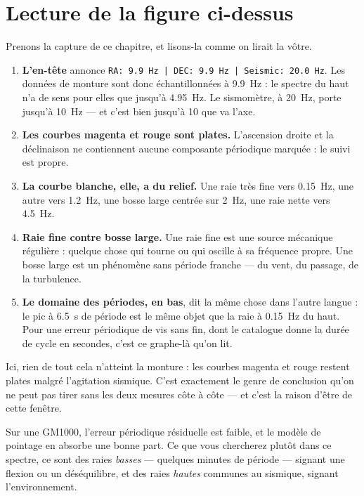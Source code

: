 \documentclass[a4paper,11pt,twoside]{report}
\begin{document}
\section{Lecture de la figure ci-dessus}

Prenons la capture de ce chapitre, et lisons-la comme on lirait la vôtre.

\begin{enumerate}
\item \textbf{L'en-tête} annonce \texttt{RA: 9.9 Hz | DEC: 9.9 Hz |
Seismic: 20.0 Hz}. Les données de monture sont donc échantillonnées à
\SI{9,9}{\hertz} : le spectre du haut n'a de sens pour elles que jusqu'à
\SI{4,95}{\hertz}. Le sismomètre, à \SI{20}{\hertz}, porte jusqu'à
\SI{10}{\hertz} --- et c'est bien jusqu'à \num{10} que va l'axe.

\item \textbf{Les courbes magenta et rouge sont plates.} L'ascension droite
et la déclinaison ne contiennent aucune composante périodique marquée : le
suivi est propre.

\item \textbf{La courbe blanche, elle, a du relief.} Une raie très fine vers
\SI{0,15}{\hertz}, une autre vers \SI{1,2}{\hertz}, une bosse large centrée
sur \SI{2}{\hertz}, une raie nette vers \SI{4,5}{\hertz}.

\item \textbf{Raie fine contre bosse large.} Une raie fine est une source
mécanique régulière : quelque chose qui tourne ou qui oscille à sa fréquence
propre. Une bosse large est un phénomène sans période franche --- du vent, du
passage, de la turbulence.

\item \textbf{Le domaine des périodes, en bas}, dit la même chose dans
l'autre langue : le pic à \SI{6,5}{\second} de période est le même objet que
la raie à \SI{0,15}{\hertz} du haut. Pour une erreur périodique de vis sans
fin, dont le catalogue donne la durée de cycle en secondes, c'est ce
graphe-là qu'on lit.
\end{enumerate}

\begin{warning}
Ici, rien de tout cela n'atteint la monture : les courbes magenta et rouge
restent plates malgré l'agitation sismique. C'est exactement le genre de
conclusion qu'on ne peut pas tirer sans les deux mesures côte à côte --- et
c'est la raison d'être de cette fenêtre.
\end{warning}

\begin{tip}
Sur une GM1000, l'erreur périodique résiduelle est faible, et le modèle de
pointage en absorbe une bonne part. Ce que vous chercherez plutôt dans ce
spectre, ce sont des raies \emph{basses} --- quelques minutes de période ---
signant une flexion ou un déséquilibre, et des raies \emph{hautes} communes
au sismique, signant l'environnement.
\end{tip}
\end{document}
